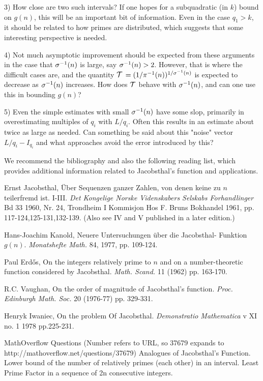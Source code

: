 \documentclass[12pt,leqno]{article}
\begin{document}
3) How close are two such intervals?  If one hopes for a subquadratic (in $k$) bound on
$g(n)$, this will be an important bit of information.  Even in the case $q_1 \gt k$,
it should be related to how primes are distributed, which suggests that some interesting
perspective is needed. 

4) Not much asymptotic improvement should be expected from these arguments in the case
that ${\sigma}^{-1}(n)$ is large, say ${\sigma}^{-1}(n) > 2$.  However, that is where the difficult cases
are, and the quantity $\cal{T}$  $= (1/{\pi}^{-1}(n))^{1/{\sigma}^{-1}(n)}$ is expected to decrease as ${\sigma}^{-1}(n)$ increases.
How does $\cal{T}$ behave with ${\sigma}^{-1}(n)$, and can one use this in 
bounding $g(n)$?

5) Even the simple estimates with small ${\sigma}^{-1}(n)$ have some slop, primarily in overestimating
multiples of $q_i$ with
$L/q_i$.  Often this results in an estimate about twice as large as needed.  Can something
be said about this "noise" vector $L/q_i - I_{q_i}$ and what approaches avoid the error
introduced by this? 

We recommend the bibliography and also the following reading list, 
which provides additional information related to Jacobsthal's function and
applications.

Ernst Jacobsthal, \"{U}ber Sequenzen ganzer Zahlen, von denen keine zu $n$ teilerfremd ist. I-III.
\textit{Det Kongelige Norske Videnskabers Selskabs Forhandlinger} Bd 33 1960, Nr. 24,
Trondheim I Kommisjon Hos F. Bruns Bokhandel 1961, pp. 117-124,125-131,132-139.
(Also see IV and V published in a later edition.)
 
Hans-Joachim Kanold, Neuere Untersuchungen \"{u}ber die Jacobsthal- Funktion $g(n)$.
\textit{Monatshefte Math.} 84, 1977, pp. 109-124.

Paul Erd\H{o}s, On the integers relatively prime to $n$
and on a number-theoretic function considered by Jacobsthal.
\textit{Math. Scand.} 11 (1962) pp. 163-170.

R.C. Vaughan, On the order of magnitude of Jacobsthal's function.
\textit{Proc. Edinburgh Math. Soc.} 20 (1976-77) pp. 329-331.

Henryk Iwaniec, On the problem Of Jacobsthal.
\textit{Demonstratio Mathematica} v XI no. 1 1978 pp.225-231.


MathOverflow Questions (Number refers to URL, so 37679
expands to http://mathoverflow.net/questions/37679)  Analogues of Jacobsthal's Function.  Lower bound of the number of relatively primes (each other)
in an interval.  Least Prime Factor in a sequence of 2n consecutive integers. 
\end{document}
